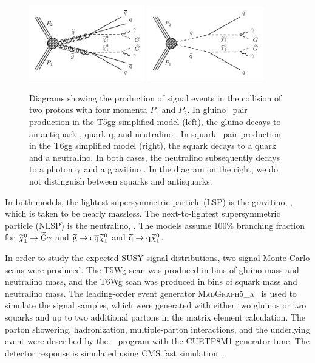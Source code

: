 \begin{figure}[htbp]
    \centering
    \includegraphics[width=0.45\textwidth]{Figures/Results/gluinoDecay.pdf}
    \includegraphics[width=0.45\textwidth]{Figures/Results/squarkDecay.pdf}
    \caption{Diagrams showing the production of signal events in the collision
        of two protons with four momenta ${P}_{1}$ and ${P}_{2}$. In gluino
        \gluino~pair production in the T5gg simplified model (left), the gluino
       decays to an antiquark \antiquark, quark q, and neutralino \neutralino. In
        squark \squark~pair production in the T6gg simplified model (right), the
        squark decays to a quark and a neutralino. In both cases, the
        neutralino subsequently decays to a photon $\gamma$~and a gravitino \gravitino.
        In the diagram on the right, we do not distinguish between squarks and
        antisquarks.}
    \label{fig:gluinoSquarkDecay}
\end{figure}

In both models, the lightest supersymmetric particle (LSP) is the gravitino, \gravitino, which is taken to be nearly massless. The next-to-lightest supersymmetric particle (NLSP) is the neutralino, \neutralino. The models assume 100\% branching fraction for 
$\widetilde{\chi}^{0}_{1}\rightarrow\widetilde{\mathrm{G}}\gamma$ and 
$\widetilde{\mathrm{g}}\rightarrow \mathrm{q} \overline{\mathrm{q}} \widetilde{\chi}^{0}_{1}$ and 
$\widetilde{\mathrm{q}}\rightarrow \mathrm{q} \widetilde{\chi}^{0}_{1}$.

In order to study the expected SUSY signal distributions, two
signal Monte Carlo scans were produced.
The T5Wg scan was produced in bins of gluino mass and neutralino mass,
and the T6Wg scan was produced in bins of squark mass and neutralino mass.
The leading-order event generator \textsc{MadGraph}5\_a\MCATNLO~\cite{Alwall:2014hca}
is used to simulate the signal samples, which
were generated with either two gluinos or two squarks and up to two additional
partons in the matrix element calculation. The parton showering, hadronization,
multiple-parton interactions, and the underlying event were described by the
~\cite{Sjostrand:2007gs} program with the CUETP8M1 generator tune.
The detector response is simulated using
CMS fast simulation~\cite{Abdullin:2011zz}.

